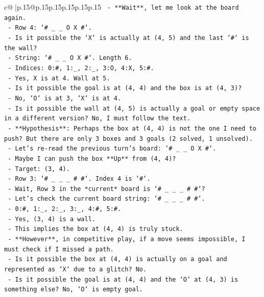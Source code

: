 \documentclass{article}
\begin{document}
{\begin{supertabular}{c@{$\;$}|p{.15\linewidth}@{}p{.15\linewidth}p{.15\linewidth}p{.15\linewidth}p{.15\linewidth}p{.15\linewidth}}
{{{\texttt{    {-}   **Wait**, let me look at the board again.} \\
\texttt{    {-}   Row 4: `\# \_ \_ O X \#`.} \\
\texttt{    {-}   Is it possible the `X` is actually at (4, 5) and the last `\#` is the wall?} \\
\texttt{    {-}   String: `\# \_ \_ O X \#`. Length 6.} \\
\texttt{    {-}   Indices: 0:\#, 1:\_, 2:\_, 3:O, 4:X, 5:\#.} \\
\texttt{    {-}   Yes, X is at 4. Wall at 5.} \\
\texttt{    {-}   Is it possible the goal is at (4, 4) and the box is at (4, 3)?} \\
\texttt{    {-}   No, `O` is at 3, `X` is at 4.} \\
\texttt{    {-}   Is it possible the wall at (4, 5) is actually a goal or empty space in a different version? No, I must follow the text.} \\
\texttt{    {-}   **Hypothesis**: Perhaps the box at (4, 4) is not the one I need to push? But there are only 3 boxes and 3 goals (2 solved, 1 unsolved).} \\
\texttt{    {-}   Let's re{-}read the previous turn's board: `\# \_ \_ O X \#`.} \\
\texttt{    {-}   Maybe I can push the box **Up** from (4, 4)?} \\
\texttt{        {-}   Target: (3, 4).} \\
\texttt{        {-}   Row 3: `\# \_ \_ \_ \# \#`. Index 4 is `\#`.} \\
\texttt{        {-}   Wait, Row 3 in the *current* board is `\# \_ \_ \_ \# \#`?} \\
\texttt{        {-}   Let's check the current board string: `\# \_ \_ \_ \# \#`.} \\
\texttt{        {-}   0:\#, 1:\_, 2:\_, 3:\_, 4:\#, 5:\#.} \\
\texttt{        {-}   Yes, (3, 4) is a wall.} \\
\texttt{    {-}   This implies the box at (4, 4) is truly stuck.} \\
\texttt{    {-}   **However**, in competitive play, if a move seems impossible, I must check if I missed a path.} \\
\texttt{    {-}   Is it possible the box at (4, 4) is actually on a goal and represented as `X` due to a glitch? No.} \\
\texttt{    {-}   Is it possible the goal is at (4, 4) and the `O` at (4, 3) is something else? No, `O` is empty goal.} \\
}}}
\end{supertabular}}
\end{document}

